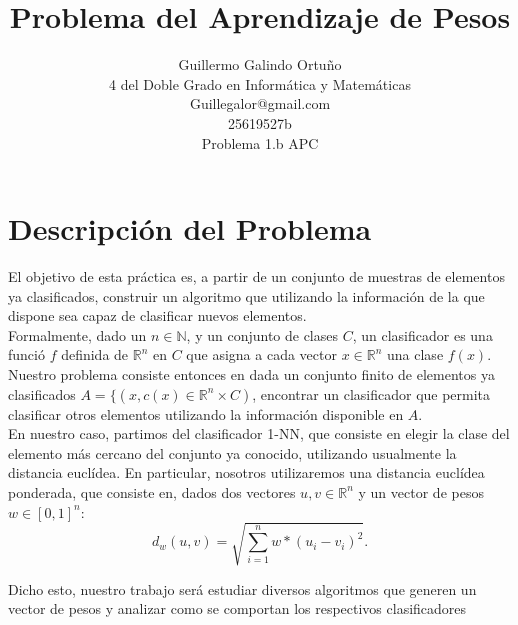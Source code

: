 \documentclass[size=a4, parskip=half, titlepage=false, toc=flat, toc=bib, 12pt]{scrartcl}
\begin{document}
\renewcommand{\proofname}{\normalfont\sffamily\bfseries\small DEMOSTRACIÓN}

\title{Problema del Aprendizaje de Pesos}
\subject{Metaheurísticas}
\author{Guillermo Galindo Ortuño\\
    4 del Doble Grado en Informática y Matemáticas\\
    Guillegalor@gmail.com\\
    25619527b\\
    Problema 1.b APC}
\publishers{\vspace{2cm}\texttt{[image: UGR]}\vspace{1cm}}
\maketitle
\newpage
\tableofcontents
\newpage

\section{Descripción del Problema}

El objetivo de esta práctica es, a partir de un conjunto de muestras de elementos ya clasificados, construir un algoritmo que utilizando la información de la que dispone sea capaz de clasificar nuevos elementos. \\

Formalmente, dado un $n \in \mathbb{N}$, y un conjunto de clases $C$, un clasificador es una funció $f$ definida de  $\mathbb{R}^n$ en $C$ que asigna a cada vector $x \in \mathbb{R}^n$ una clase $f(x)$.\\

Nuestro problema consiste entonces en dada un conjunto finito de elementos ya clasificados $A = \{(x,c(x) \in \mathbb{R}^n \times C)$, encontrar un clasificador que permita clasificar otros elementos utilizando la información disponible en $A$. \\

En nuestro caso, partimos del clasificador 1-NN, que consiste en elegir la clase del elemento más cercano del conjunto ya conocido, utilizando usualmente la distancia euclídea. En particular, nosotros utilizaremos una distancia euclídea ponderada, que consiste en, dados dos vectores $u, v \in \mathbb{R}^n$ y un vector de pesos $w \in [0,1]^n$:
\[
d_w(u,v) = \sqrt{\sum_{i = 1}^{n}w*(u_i - v_i)^2}
.\]

Dicho esto, nuestro trabajo será estudiar diversos algoritmos que generen un vector de pesos y analizar como se comportan los respectivos clasificadores \newpage
\end{document}
